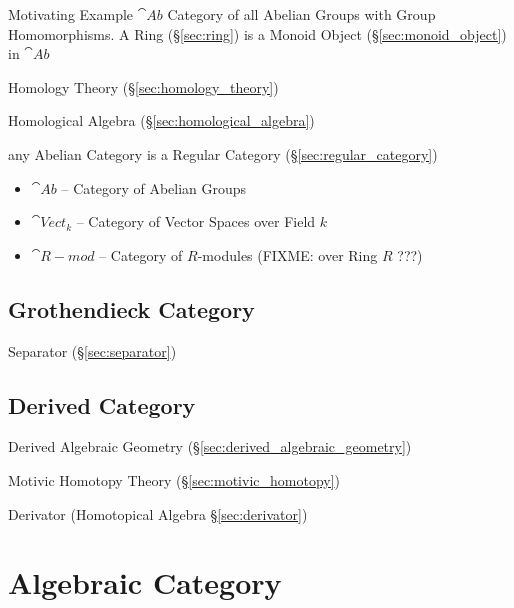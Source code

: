 Motivating Example $\cat{Ab}$ Category of all Abelian Groups with
Group Homomorphisms. A Ring (\S\ref{sec:ring}) is a Monoid Object
(\S\ref{sec:monoid_object}) in $\cat{Ab}$

Homology Theory (\S\ref{sec:homology_theory})

Homological Algebra (\S\ref{sec:homological_algebra})

any Abelian Category is a Regular Category
(\S\ref{sec:regular_category})

\begin{itemize}
  \item $\cat{Ab}$ -- Category of Abelian Groups
  \item $\cat{Vect}_k$ -- Category of Vector Spaces over Field $k$
  \item $\cat{R-mod}$ -- Category of $R$-modules (FIXME: over Ring $R$ ???)
\end{itemize}



\subsection{Grothendieck Category}\label{sec:grothendieck_category}

Separator (\S\ref{sec:separator})



\subsection{Derived Category}\label{sec:derived_category}

Derived Algebraic Geometry (\S\ref{sec:derived_algebraic_geometry})

Motivic Homotopy Theory (\S\ref{sec:motivic_homotopy})

Derivator (Homotopical Algebra \S\ref{sec:derivator})



\section{Algebraic Category}\label{sec:algebraic_category}

